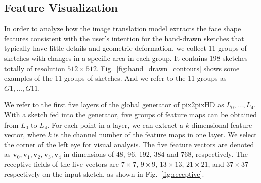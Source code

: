 \documentclass[10pt,twocolumn,letterpaper]{article}
\begin{document}
\subsection{Feature Visualization}\label{sec:visualize}



In order to analyze how the image translation model extracts the face shape features consistent with the user's intention for the hand-drawn sketches that typically have little details and geometric deformation, we collect 11 groups of sketches with changes in a specific area in each group. It contains 198 sketches totally of resolution $512\times512$. Fig.~\ref{fig:hand_drawn_contours} shows some examples of the 11 groups of sketches. And we refer to the 11 groups as $G1,\ldots,G11$.

We refer to the first five layers of the global generator of pix2pixHD as $L_0,\ldots,L_4$. 
With a sketch fed into the generator, five groups of feature maps can be obtained from $L_0$ to $L_4$.
For each point in a layer, we can extract a $k$-dimensional feature vector, where $k$ is the channel number of the feature maps in one layer.
We select the corner of the left eye for visual analysis. 
The five feature vectors are denoted as $\boldsymbol{v}_0,\boldsymbol{v}_1,\boldsymbol{v}_2,\boldsymbol{v}_3,\boldsymbol{v}_4$ in dimensions of 48, 96, 192, 384 and 768, respectively. 
The receptive fields of the five vectors are $7\times7$, $9\times9$, $13\times13$, $21\times21$, and $37\times37$ respectively on the input sketch, as shown in Fig.~\ref{fig:receptive}. 


 
\end{document}
